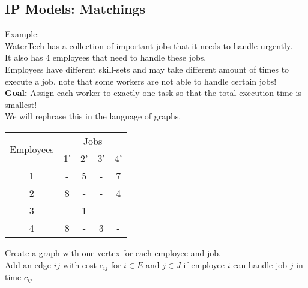 \documentclass[letterpaper, 12pt]{article}
\begin{document}
    \subsection{IP Models: Matchings}
    Example:\\
    WaterTech has a collection of important jobs that it needs to handle urgently.\\
    It also has 4 employees that need to handle these jobs.\\
    Employees have different skill-sets and may take different amount of times to execute a job, note that
    some workers are not able to handle certain jobs!\\
    \bigskip
    \textbf{Goal:} Assign each worker to exactly one task so that the total execution time is smallest!\\
    We will rephrase this in the language of graphs.\\
    \bigskip
    \begin{center}
        \begin{tabular}{|c|c|c|c|c|}
            \hline
            \multirow{2}{*}{Employees} & \multicolumn{4}{|c|}{Jobs}\\
            \cline{2-5}
            & 1' & 2' & 3' & 4'\\
            \hline
            1 & - & 5 & - & 7\\
            2 & 8 & - & - & 4\\
            3 & - & 1 & - & -\\
            4 & 8 & - & 3 & -\\
            \hline
        \end{tabular}
    \end{center}
    \bigskip

    Create a graph with one vertex for each employee and job.\\
    Add an edge $ij$ with cost $c_{ij}$ for $i \in E$ and $j \in J$ if employee $i$ can handle job $j$ in time $c_{ij}$\\

    \begin{center}
    \end{center}
    
\end{document}
